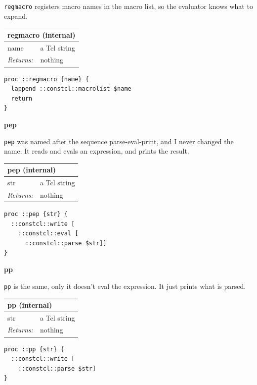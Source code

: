\documentclass[twoside,9pt]{report}
\begin{document}
\texttt{regmacro} registers macro names in the macro list, so the evaluator knows what to expand.

\begin{tabular}{ |l l| }
\hline
\multicolumn{2}{|l|}{regmacro (internal)} \\
\hline
name & a Tcl string \\
\textit{Returns:} & nothing \\
\hline
\end{tabular}

\noindent\makebox[\linewidth]{\rule{\linewidth}{0.4pt}}
\begin{lstlisting}
proc ::regmacro {name} {
  lappend ::constcl::macrolist $name
  return
}
\end{lstlisting}
\noindent\makebox[\linewidth]{\rule{\linewidth}{0.4pt}}

\textbf{pep}


\texttt{pep} was named after the sequence parse-eval-print, and I never changed the name. It reads and evals an expression, and prints the result.

\begin{tabular}{ |l l| }
\hline
\multicolumn{2}{|l|}{pep (internal)} \\
\hline
str & a Tcl string \\
\textit{Returns:} & nothing \\
\hline
\end{tabular}

\noindent\makebox[\linewidth]{\rule{\linewidth}{0.4pt}}
\begin{lstlisting}
proc ::pep {str} {
  ::constcl::write [
    ::constcl::eval [
      ::constcl::parse $str]]
}
\end{lstlisting}
\noindent\makebox[\linewidth]{\rule{\linewidth}{0.4pt}}

\textbf{pp}


\texttt{pp} is the same, only it doesn't eval the expression. It just prints what is parsed.

\begin{tabular}{ |l l| }
\hline
\multicolumn{2}{|l|}{pp (internal)} \\
\hline
str & a Tcl string \\
\textit{Returns:} & nothing \\
\hline
\end{tabular}

\noindent\makebox[\linewidth]{\rule{\linewidth}{0.4pt}}
\begin{lstlisting}
proc ::pp {str} {
  ::constcl::write [
    ::constcl::parse $str]
}
\end{lstlisting}
\noindent\makebox[\linewidth]{\rule{\linewidth}{0.4pt}}
\end{document}
